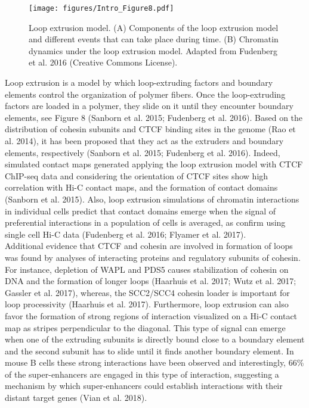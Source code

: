 		\begin{figure}[h!]
			\centering
			\texttt{[image: figures/Intro\_Figure8.pdf]}
  			\caption[intro8]{Loop extrusion model. (A) Components of the loop extrusion model and different events that can take place during time. (B) Chromatin dynamics under the loop extrusion model. Adapted from Fudenberg et al. 2016 (Creative Commons License).}
			\label{intro8}
		\end{figure}


Loop extrusion is a model by which loop-extruding factors and boundary elements control the organization of polymer fibers. Once the loop-extruding factors are loaded in a polymer, they slide on it until they encounter boundary elements, see Figure 8 (Sanborn et al. 2015; Fudenberg et al. 2016). Based on the distribution of cohesin subunits and CTCF binding sites in the genome (Rao et al. 2014), it has been proposed that they act as the extruders and boundary elements, respectively (Sanborn et al. 2015; Fudenberg et al. 2016). Indeed, simulated contact maps generated applying the loop extrusion model with CTCF ChIP-seq data and considering the orientation of CTCF sites show high correlation with Hi-C contact maps, and the formation of contact domains (Sanborn et al. 2015). Also, loop extrusion simulations of chromatin interactions in individual cells predict that contact domains emerge when the signal of preferential interactions in a population of cells is averaged, as confirm using single cell Hi-C data (Fudenberg et al. 2016; Flyamer et al. 2017).\\

Additional evidence that CTCF and cohesin are involved in formation of loops was found by analyses of interacting proteins and regulatory subunits of cohesin. For instance, depletion of WAPL and PDS5 causes stabilization of cohesin on DNA and the formation of longer loops (Haarhuis et al. 2017; Wutz et al. 2017; Gassler et al. 2017), whereas, the SCC2/SCC4 cohesin loader is important for loop processivity (Haarhuis et al. 2017). Furthermore, loop extrusion can also favor the formation of strong regions of interaction visualized on a Hi-C contact map as stripes perpendicular to the diagonal. This type of signal can emerge when one of the extruding subunits is directly bound close to a boundary element and the second subunit has to slide until it finds another boundary element. In mouse B cells these strong interactions have been observed and interestingly, 66\% of the super-enhancers are engaged in this type of interaction, suggesting a mechanism by which super-enhancers could establish interactions with their distant target genes (Vian et al. 2018).\\

